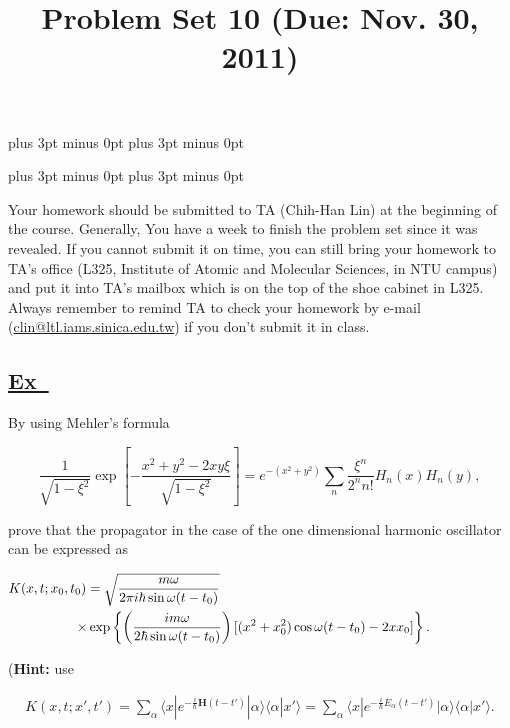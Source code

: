 \documentclass[a4paper,12pt]{article}
\newcommand{\excercise}{\addtocounter{section}{+1}
\subsection*{\underline{Ex~\thesection}}}
\newcommand{\bra}[1]{\langle#1|}
\newcommand{\ket}[1]{|#1\rangle }
\newcommand{\braket}[2]{\langle#1|#2\rangle }
\begin{document}
\abovedisplayskip=-6pt plus 3pt minus 0pt
\belowdisplayskip=8pt plus 3pt minus 0pt

\abovedisplayshortskip=-6pt plus 3pt minus 0pt
\belowdisplayshortskip=8pt plus 3pt minus 0pt

\title{Problem Set 10 (Due: Nov. 30, 2011)}
\maketitle

Your homework should be submitted to TA (Chih-Han Lin) at the  beginning of the course. Generally, You have a week to finish the problem set since it was revealed. If you cannot submit it on time, you can still bring your homework to TA's office (L325, Institute of Atomic and Molecular Sciences, in NTU campus) and put it into TA's mailbox which is on the top of the shoe cabinet in L325. Always remember to remind TA to check your homework by e-mail (\url{clin@ltl.iams.sinica.edu.tw}) if you don't submit it in class.

%


\excercise 
By using Mehler's formula

$$
\frac{1}{\sqrt{1-\xi^2}}\exp\left[-\frac{x^2+y^2-2xy\xi}{\sqrt{1-\xi^2}}\right]=
e^{-(x^2+y^2)}\sum_n\frac{\xi^n}{2^nn!}H_n(x)H_n(y),
$$


\noindent prove that the propagator in the case of the one dimensional harmonic oscillator can be expressed as 	

\begin{align}
\notag K(x,t;x_0,t_0)=\sqrt{\frac{m\omega}{2\pi i\hbar\sin\omega(t-t_0)}} ~~~~~\quad\quad\quad\quad\quad\quad\quad\quad\quad\quad\quad\quad\quad\quad~~~~~~~~~~~~~~~~~~\\
\times\exp\left\{\left(\frac{im\omega}{2\hbar\sin\omega (t-t_0)}\right) [(x^2+x_0^2)\cos\omega (t-t_0)-2xx_0]\right\}.~~~~~~~~~~~~~~~~~~
\end{align}

(\textbf{Hint:} use 

\begin{align}
K(x,t;x',t')=\sum_\alpha\bra{x}e^{-\frac{i}{\hbar}\mathbf{H}(t-t')}\ket{\alpha}\braket{\alpha}{x'}=\sum_\alpha\bra{x}e^{-\frac{i}{\hbar}E_\alpha(t-t')}\ket{\alpha}\braket{\alpha}{x'}.
\end{align}
\end{document}
